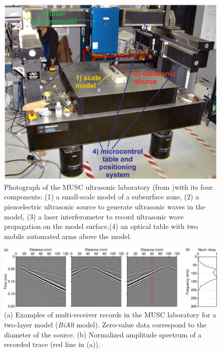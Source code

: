 \documentclass[extra,mreferee]{gji}
\newcommand{\bialt}{\textit{BiAlt} }
\begin{document}
\clearpage
\newpage

\begin{figure}
\centering
\includegraphics[width=0.50\columnwidth]{Fig/Fig01.eps}
\caption{Photograph of the MUSC ultrasonic laboratory (from \cite{bretaudeau2013fwi} )with its four components: (1) a small-scale model of a subsurface zone, (2) a piezoelectric ultrasonic source to generate ultrasonic waves in the model, (3) a laser interferometer to record ultrasonic wave propagation on the model surface,(4) an optical table with two mobile automated arms above the model.}
\label{Fig:Fig01}
\end{figure}

\clearpage
\newpage

\begin{figure}
\centering
\includegraphics[width=1.00\columnwidth]{Fig/Fig02.eps}
\caption{(a) Examples of multi-receiver records in the MUSC laboratory for a two-layer model (\bialt model). Zero-value data correspond to the diameter of the source. (b) Normalized amplitude spectrum of a recorded trace (red line in (a)).}
\label{Fig:Fig02}
\end{figure}

\clearpage
\newpage
\end{document}
